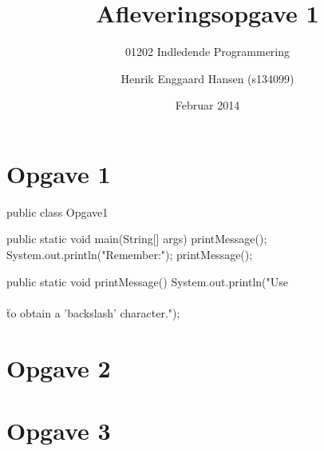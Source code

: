 \documentclass{scrartcl}
\begin{document}

\title{Afleveringsopgave 1}
\subtitle{01202 Indledende Programmering}
\author{Henrik Enggaard Hansen (s134099)}
\date{Februar 2014}
\maketitle

\section*{Opgave 1}
\begin{javacode}
public class Opgave1 {
	public static void main(String[] args) {
		printMessage();
		System.out.println("Remember:");
		printMessage();
	}

	public static void printMessage() {
		System.out.println("Use \"\\\\\" to obtain a ’backslash’ character.");
	}
}
\end{javacode}

\section*{Opgave 2}

\section*{Opgave 3}
\end{document}
